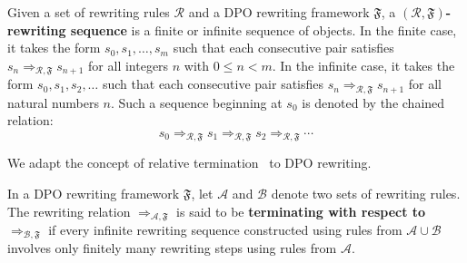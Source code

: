 \begin{definition}  
Given a set of rewriting rules $\mathcal{R}$ and a DPO rewriting framework $\mathfrak{F}$, a \textbf{$(\mathcal{R}, \mathfrak{F})$-rewriting sequence} is a finite or infinite sequence of objects. In the finite case, it takes the form $s_0, s_1, \dots, s_m$ such that each consecutive pair satisfies $s_n \Rightarrow_{\mathcal{R}, \mathfrak{F}} s_{n+1}$ for all integers $n$ with $0 \leq n < m$. In the infinite case, it takes the form $s_0, s_1, s_2, \dots$ such that each consecutive pair satisfies $s_n \Rightarrow_{\mathcal{R}, \mathfrak{F}} s_{n+1}$ for all natural numbers $n$. Such a sequence beginning at $s_0$ is denoted by the chained relation:  
\[
s_0 \Rightarrow_{\mathcal{R}, \mathfrak{F}} s_1 \Rightarrow_{\mathcal{R}, \mathfrak{F}} s_2 \Rightarrow_{\mathcal{R}, \mathfrak{F}} \cdots
\]   
\end{definition}  
We adapt the concept of relative termination~\cite{klop1987term,geser1990relative} to DPO rewriting.
\begin{definition}  
\label{termination:def:relative_termination}  
In a DPO rewriting framework $\mathfrak{F}$, let $\mathcal{A}$ and $\mathcal{B}$ denote two sets of rewriting rules. The rewriting relation $\Rightarrow_{\mathcal{A},\mathfrak{F}}$ is said to be \textbf{terminating with respect to} $\Rightarrow_{\mathcal{B},\mathfrak{F}}$ if every infinite rewriting sequence constructed using rules from $\mathcal{A} \cup \mathcal{B}$ involves only finitely many rewriting steps using rules from $\mathcal{A}$.  
\end{definition}  

